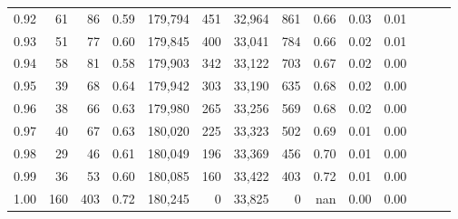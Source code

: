 \begin{tabular}{rrrrrrrrrrrrrr}
0.92 &     61 &   86 &  0.59 &  179,794 &      451 &  32,964 &     861 &  0.66 &  0.03 &      0.01 \\
0.93 &     51 &   77 &  0.60 &  179,845 &      400 &  33,041 &     784 &  0.66 &  0.02 &      0.01 \\
0.94 &     58 &   81 &  0.58 &  179,903 &      342 &  33,122 &     703 &  0.67 &  0.02 &      0.00 \\
0.95 &     39 &   68 &  0.64 &  179,942 &      303 &  33,190 &     635 &  0.68 &  0.02 &      0.00 \\
0.96 &     38 &   66 &  0.63 &  179,980 &      265 &  33,256 &     569 &  0.68 &  0.02 &      0.00 \\
0.97 &     40 &   67 &  0.63 &  180,020 &      225 &  33,323 &     502 &  0.69 &  0.01 &      0.00 \\
0.98 &     29 &   46 &  0.61 &  180,049 &      196 &  33,369 &     456 &  0.70 &  0.01 &      0.00 \\
0.99 &     36 &   53 &  0.60 &  180,085 &      160 &  33,422 &     403 &  0.72 &  0.01 &      0.00 \\
1.00 &    160 &  403 &  0.72 &  180,245 &        0 &  33,825 &       0 &   nan &  0.00 &      0.00 \\
\bottomrule
\end{tabular}
